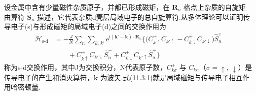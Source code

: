 设金属中含有少量磁性杂质原子，并都已形成磁矩，在 $\boldsymbol{R}_{n}$ 格点上杂质的自旋矩由算符 $\hat{\boldsymbol{S}}_{n}$ 描述，它代表杂质d壳层局域电子的总自旋算符.从多体理论可以证明传导电子(s)与形成磁矩的局域电子(d)之间的交换作用为
\begin{equation}
\begin{aligned}
  \mathscr{H}_{\mathrm{s}\text{-}\mathrm{d}}
  &=-\frac{J}{N}\sum_{n}\sum_{k,\,k'}
  \mathrm{e}^{\mathrm{i}(\boldsymbol{k}'-\boldsymbol{k})\cdot\boldsymbol{R}_{n}}
  \bigl\{\bigl(C^{+}_{k\uparrow}C_{k'\uparrow}
  -C^{+}_{k\downarrow}C_{k'\downarrow}\bigr)\hat{S}^{z}_{n}\\
  &\qquad+C^{+}_{k\uparrow}C_{k'\downarrow}\hat{S}^{-}_{n}
  +C^{+}_{k\downarrow}C_{k'\uparrow}\hat{S}^{+}_{n}\bigr\}
\end{aligned}
\end{equation}
称为s-d交换作用，其中J为交换积分，N代表原子数，$C^{+}_{k\sigma}$ 与 $C_{k\sigma}$（$\sigma=\uparrow,\,\downarrow$）是传导电子的产生和消灭算符，$\boldsymbol{k}$ 为波矢.式(11.3.1)就是局域磁矩与传导电子相互作用哈密顿量.

